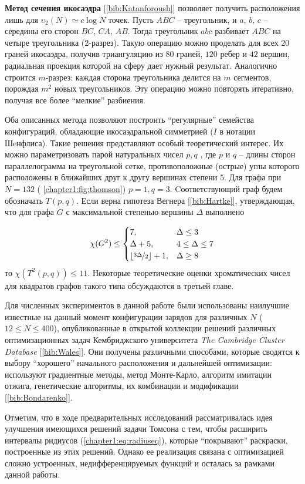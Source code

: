\textbf{Метод сечения икосаэдра} [\ref{bib:Katanforoush}] позволяет получить расположения лишь 
для $\upsilon_2(N) \simeq c\log{}N$ точек. 
Пусть $ABC$ -- треугольник, и $a,\,b,\,c$ -- середины его сторон $BC,\,CA,\,AB$. 
Тогда треугольник $abc$ разбивает $ABC$ на четыре треугольника (2-разрез). 
Такую операцию можно проделать для всех $20$ граней икосаэдра, 
получив триангуляцию из $80$ граней, $120$ ребер и $42$ вершин, радиальная проекция которой на сферу дает нужный результат. 
Аналогично строится $m$-разрез: каждая сторона треугольника делится на $m$ сегментов, порождая $m^2$ новых треугольников.
Эту операцию можно повторять итеративно, получая все более \enquote{мелкие} разбиения. 

Оба описанных метода позволяют построить \enquote{регулярные} семейства конфигураций, 
обладающие икосаэдральной симметрией ($I$ в нотации Шeнфлиса).
Такие решения представляют особый теоретический интерес.
Их можно параметризовать парой натуральных чисел $p,q$ , где $p$ и $q$ -- длины сторон параллелограмма на треугольной сетке, 
противоположные (острые) углы которого расположены в ближайших друг к другу вершинах степени $5$. 
Для графа при $N=132$ (\figurename{ \ref{chapter1:fig:thomson}}) $p=1,q=3$.
Cоответствующий граф будем обозначать $T(p,q)$. 
Если верна гипотеза Вегнера [\ref{bib:Hartke}], утверждающая, что для графа $G$ 
с максимальной степенью вершины $\Delta$ выполнено

\begin{equation}\label{chapter1:eq:wegner}
\chi(G^2) \le 
\begin{cases}
7, & \Delta \le 3 \\
\Delta + 5, & 4 \le \Delta \le 7 \\
\lfloor \nicefrac{3\Delta}{2} \rfloor + 1, & \Delta \ge 8
\end{cases}
\end{equation}
то $\chi(T^2(p,q)) \le 11$.
Некоторые теоретические оценки хроматических чисел для квадратов графов такого типа обсуждаются в третьей главе.

Для численных экспериментов в данной работе были использованы наилучшие 
известные на данный момент конфигурации зарядов для различных $N$ ($12 \le N \le 400$), опубликованные 
в открытой коллекции решений различных оптимизационных задач Кембриджского университета
\textit{The Cambridge Cluster Database} [\ref{bib:Wales}]. 
Они получены различными способами, которые сводятся к выбору \enquote{хорошего} начального расположения
и дальнейшей оптимизации: 
используют градиентные методы, метод Монте-Карло, алгоритм имитации отжига, 
генетические алгоритмы, их комбинации и модификации [\ref{bib:Bondarenko}].

Отметим, что в ходе предварительных исследований рассматривалась идея улучшения имеющихся решений задачи Томсона
с тем, чтобы расширить интервалы ридиусов (\ref{chapter1:eq:radiuseq}), которые \enquote{покрывают} раскраски, 
построенные из этих решений. Однако ее реализация связана с оптимизацией сложно устроенных, 
недифференцируемых функций и осталась за рамками данной работы.
